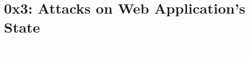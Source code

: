 \documentclass[aspectratio=169]{beamer}
\begin{document}
\section{0x3: Attacks on Web Application's State}
{
\begin{frame}
\huge{\textcolor{white}{\textbf{0x3: Stateful Attacks}}}
\end{frame}
}


\end{document}
